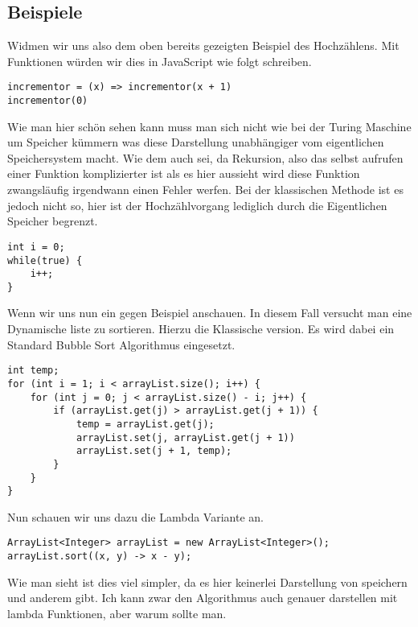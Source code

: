 \subsection{Beispiele}
Widmen wir uns also dem oben bereits gezeigten Beispiel des Hochzählens. Mit Funktionen würden wir dies in JavaScript wie folgt schreiben.
\begin{verbatim}
incrementor = (x) => incrementor(x + 1)
incrementor(0)
\end{verbatim}
Wie man hier schön sehen kann muss man sich nicht wie bei der Turing Maschine um Speicher kümmern was diese Darstellung unabhängiger vom eigentlichen Speichersystem macht. Wie dem auch sei, da Rekursion, also das selbst aufrufen einer Funktion komplizierter ist als es hier aussieht wird diese Funktion zwangsläufig irgendwann einen Fehler werfen. Bei der klassischen Methode ist es jedoch nicht so, hier ist der Hochzählvorgang lediglich durch die Eigentlichen Speicher begrenzt.
\begin{verbatim}
int i = 0;
while(true) {
	i++;
}
\end{verbatim}
Wenn wir uns nun ein gegen Beispiel anschauen. In diesem Fall versucht man eine Dynamische liste zu sortieren. Hierzu die Klassische version. Es wird dabei ein Standard Bubble Sort Algorithmus eingesetzt.\newpage
\begin{verbatim}
int temp;
for (int i = 1; i < arrayList.size(); i++) {
	for (int j = 0; j < arrayList.size() - i; j++) {
		if (arrayList.get(j) > arrayList.get(j + 1)) {
			temp = arrayList.get(j);
			arrayList.set(j, arrayList.get(j + 1))
			arrayList.set(j + 1, temp);    	
		}
	}
}
\end{verbatim}
Nun schauen wir uns dazu die Lambda Variante an.
\begin{verbatim}
ArrayList<Integer> arrayList = new ArrayList<Integer>();
arrayList.sort((x, y) -> x - y);
\end{verbatim}
Wie man sieht ist dies viel simpler, da es hier keinerlei Darstellung von speichern und anderem gibt. Ich kann zwar den Algorithmus auch genauer darstellen mit lambda Funktionen, aber warum sollte man.